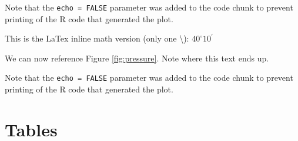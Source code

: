 \documentclass[12pt,]{article}
\begin{document}
\begin{itemize}
Note that the \texttt{echo\ =\ FALSE} parameter was added to the code
chunk to prevent printing of the R code that generated the plot.

\FloatBarrier

This is the LaTex inline math version (only one \textbackslash{}):
\(40^\circ 10^\prime\)

\FloatBarrier

We can now reference Figure \ref{fig:pressure}. Note where this text
ends up.

Note that the \texttt{echo = FALSE} parameter was added to the code
chunk to prevent printing of the R code that generated the plot.

\section{Tables}\label{tables}

\begin{table}[ht]
\centering
\caption{This is where you write your caption} 
\label{tab:Table_example}
\end{table}


\end{itemize}
\end{document}
